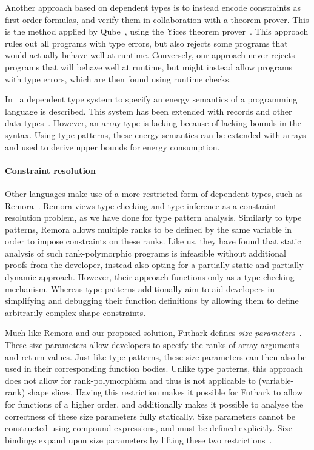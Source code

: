 \documentclass[sigconf,screen]{acmart}
\begin{document}
Another approach based on dependent types is to instead encode constraints as first-order formulas, and verify them in collaboration with a theorem prover.
This is the method applied by Qube~\cite{qube}, using the Yices theorem prover~\cite{yices}.
This approach rules out all programs with type errors, but also rejects some programs that would actually behave well at runtime.
Conversely, our approach never rejects programs that will behave well at runtime, but might instead allow programs with type errors, which are then found using runtime checks.

In~\cite{DBLP:conf/fopara/GastelKE15} a dependent type system to specify an energy semantics of a programming language is described.
This system has been extended with records and other data types~\cite{DBLP:journals/corr/GastelE17}.
However, an array type is lacking because of lacking bounds in the syntax.
Using type patterns, these energy semantics can be extended with arrays and used to derive upper bounds for energy consumption.

\paragraph*{Constraint resolution}
Other languages make use of a more restricted form of dependent types, such as Remora~\cite{remora,remora-polymorphism}.
Remora views type checking and type inference as a constraint resolution problem, as we have done for type pattern analysis.
Similarly to type patterns, Remora allows multiple ranks to be defined by the same variable in order to impose constraints on these ranks.
Like us, they have found that static analysis of such rank-polymorphic programs is infeasible without additional proofs from the developer, instead also opting for a partially static and partially dynamic approach.
However, their approach functions only as a type-checking mechanism.
Whereas type patterns additionally aim to aid developers in simplifying and debugging their function definitions by allowing them to define arbitrarily complex shape-constraints.

Much like Remora and our proposed solution, Futhark defines \emph{size parameters}~\cite{futhark,futhark-size-parameters}.
These size parameters allow developers to specify the ranks of array arguments and return values.
Just like type patterns, these size parameters can then also be used in their corresponding function bodies.
Unlike type patterns, this approach does not allow for rank-polymorphism and thus is not applicable to (variable-rank) shape slices.
Having this restriction makes it possible for Futhark to allow for functions of a higher order, and additionally makes it possible to analyse the correctness of these size parameters fully statically.
Size parameters cannot be constructed using compound expressions, and must be defined explicitly.
Size bindings expand upon size parameters by lifting these two restrictions~\cite{size-dependent-types}.
\end{document}
